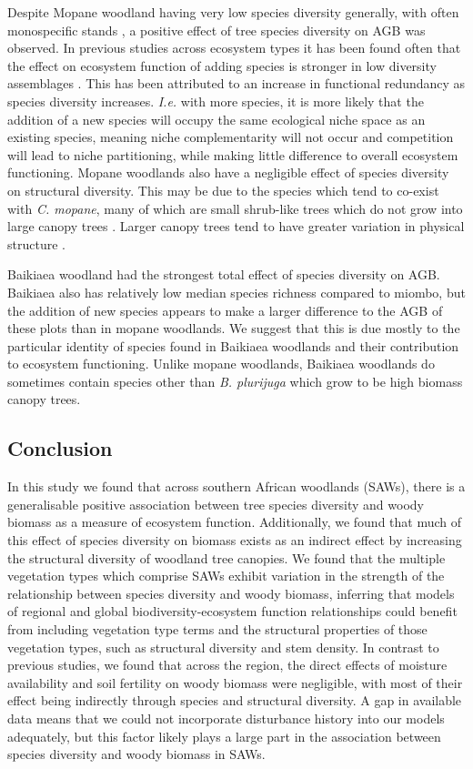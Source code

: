 \documentclass[11pt,a4paper]{article}
\begin{document}
Despite Mopane woodland having very low species diversity generally, with often monospecific stands \citep{Timberlake2010}, a positive effect of tree species diversity on AGB was observed. In previous studies across ecosystem types it has been found often that the effect on ecosystem function of adding species is stronger in low diversity assemblages \citep{Hector2007}. This has been attributed to an increase in functional redundancy as species diversity increases. \textit{I.e.} with more species, it is more likely that the addition of a new species will occupy the same ecological niche space as an existing species, meaning niche complementarity will not occur and competition will lead to niche partitioning, while making little difference to overall ecosystem functioning. Mopane woodlands also have a negligible effect of species diversity on structural diversity. This may be due to the species which tend to co-exist with \textit{C. mopane}, many of which are small shrub-like trees which do not grow into large canopy trees \citep{Timberlake2010}. Larger canopy trees tend to have greater variation in physical structure \citep{Seidel2019}.

Baikiaea woodland had the strongest total effect of species diversity on AGB. Baikiaea also has relatively low median species richness compared to miombo, but the addition of new species appears to make a larger difference to the AGB of these plots than in mopane woodlands. We suggest that this is due mostly to the particular identity of species found in Baikiaea woodlands and their contribution to ecosystem functioning. Unlike mopane woodlands, Baikiaea woodlands do sometimes contain species other than \textit{B. plurijuga} which grow to be high biomass canopy trees. 

\subsection{Conclusion}

In this study we found that across southern African woodlands (SAWs), there is a generalisable positive association between tree species diversity and woody biomass as a measure of ecosystem function. Additionally, we found that much of this effect of species diversity on biomass exists as an indirect effect by increasing the structural diversity of woodland tree canopies. We found that the multiple vegetation types which comprise SAWs exhibit variation in the strength of the relationship between species diversity and woody biomass, inferring that models of regional and global biodiversity-ecosystem function relationships could benefit from including vegetation type terms and the structural properties of those vegetation types, such as structural diversity and stem density. In contrast to previous studies, we found that across the region, the direct effects of moisture availability and soil fertility on woody biomass were negligible, with most of their effect being indirectly through species and structural diversity. A gap in available data means that we could not incorporate disturbance history into our models adequately, but this factor likely plays a large part in the association between species diversity and woody biomass in SAWs.
\end{document}
